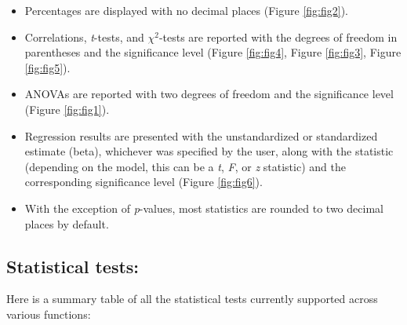 \documentclass[
]{article}
\providecommand{\tightlist}{%
  \setlength{\itemsep}{0pt}\setlength{\parskip}{0pt}}
\begin{document}
\begin{itemize}
\tightlist
\item
  Percentages are displayed with no decimal places (Figure \ref{fig:fig2}).
\item
  Correlations, \emph{t}-tests, and \(\chi^2\)-tests are reported with the degrees
  of freedom in parentheses and the significance level (Figure \ref{fig:fig4},
  Figure \ref{fig:fig3}, Figure \ref{fig:fig5}).
\item
  ANOVAs are reported with two degrees of freedom and the significance level
  (Figure \ref{fig:fig1}).
\item
  Regression results are presented with the unstandardized or standardized
  estimate (beta), whichever was specified by the user, along with the
  statistic (depending on the model, this can be a \emph{t}, \emph{F}, or \emph{z} statistic)
  and the corresponding significance level (Figure \ref{fig:fig6}).
\item
  With the exception of \emph{p}-values, most statistics are rounded to two decimal
  places by default.
\end{itemize}

\hypertarget{statistical-tests}{%
\subsection{Statistical tests:}\label{statistical-tests}}

Here is a summary table of all the statistical tests currently supported across
various functions:
\end{document}
